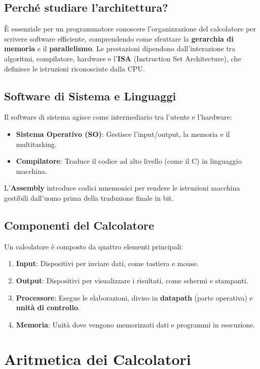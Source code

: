 \documentclass[12pt, a4paper]{article}
\begin{document}
\subsection{Perché studiare l'architettura?}
È essenziale per un programmatore conoscere l'organizzazione del calcolatore per scrivere software efficiente, comprendendo come sfruttare la \textbf{gerarchia di memoria} e il \textbf{parallelismo}. Le prestazioni dipendono dall'interazione tra algoritmi, compilatore, hardware e l'\textbf{ISA} (Instruction Set Architecture), che definisce le istruzioni riconosciute dalla CPU.

\subsection{Software di Sistema e Linguaggi}
Il software di sistema agisce come intermediario tra l'utente e l'hardware:
\begin{itemize}
    \item \textbf{Sistema Operativo (SO)}: Gestisce l'input/output, la memoria e il multitasking.
    \item \textbf{Compilatore}: Traduce il codice ad alto livello (come il C) in linguaggio macchina.
\end{itemize}
L'\textbf{Assembly} introduce codici mnemonici per rendere le istruzioni macchina gestibili dall'uomo prima della traduzione finale in bit.

\subsection{Componenti del Calcolatore}
Un calcolatore è composto da quattro elementi principali:
\begin{enumerate}
    \item \textbf{Input}: Dispositivi per inviare dati, come tastiera e mouse.
    \item \textbf{Output}: Dispositivi per visualizzare i risultati, come schermi e stampanti.
    \item \textbf{Processore}: Esegue le elaborazioni, diviso in \textbf{datapath} (parte operativa) e \textbf{unità di controllo}.
    \item \textbf{Memoria}: Unità dove vengono memorizzati dati e programmi in esecuzione.
\end{enumerate}
\section{Aritmetica dei Calcolatori}
\end{document}
